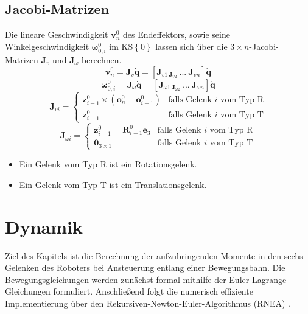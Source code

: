 \subsection{Jacobi-Matrizen}
Die lineare Geschwindigkeit $\bm{v}^0_n$ des Endeffektors, sowie seine Winkelgeschwindigkeit $\bm{\omega}^0_{0,i}$ im  KS$\left\{0\right\}$ lassen sich über die $3\times n$-Jacobi-Matrizen $\bm{J}_v$ und $\bm{J}_{\omega}$ berechnen. 
%
\begin{equation}
	\bm{v}^0_n = \bm{J}_v \dot{\bm{q}} = \left[\bm{J}_{v1 \ \bm{J}_{v2}} \ ...\  \bm{J}_{vn}\right] \dot{\bm{q}}
\end{equation}
%
\begin{equation}
	\bm{\omega}^0_{0,i} = \bm{J}_{\omega} \dot{\bm{q}}  = \left[\bm{J}_{\omega1 \ \bm{J}_{\omega2}} \ ...\  \bm{J}_{\omega n}\right] \dot{\bm{q}}
\end{equation}
%
\begin{equation}
	\bm{J}_{vi} = \begin{cases} 
		\bm{z}^0_{i-1} \times (\bm{o}^0_{n} - \bm{o}^0_{i-1}) & \text{falls Gelenk } i \text{ vom Typ } \text{R} \\
		\bm{z}^0_{i-1} & \text{falls Gelenk } i \text{ vom Typ } \text{T}
	\end{cases}
\end{equation}
%
\begin{equation}
	\bm{J}_{\omega i} = \begin{cases} 
		\bm{z}^0_{i-1} = \bm{R}^0_{i-1}\bm{e}_3 & \text{falls Gelenk } i \text{ vom Typ } \text{R} \\
		\mathbf{0}_{3 \times 1} & \text{falls Gelenk } i \text{ vom Typ } \text{T}
	\end{cases}
\end{equation}
%
\begin{itemize}
	\item Ein Gelenk vom Typ R ist ein Rotationsgelenk.
	\item Ein Gelenk vom Typ T ist ein Translationsgelenk.
\end{itemize}
%
\cite{Rieber.2022}
%
%
\section{Dynamik}
Ziel des Kapitels ist die Berechnung der aufzubringenden Momente in den sechs Gelenken des Roboters bei Ansteuerung entlang einer Bewegungsbahn.
Die Bewegungsgleichungen werden zunächst formal mithilfe der Euler-Lagrange Gleichungen formuliert. Anschließend folgt die numerisch effiziente Implementierung  über den Rekursiven-Newton-Euler-Algorithmus (RNEA) \cite[S.~247]{Grimble.2009}. 
%
